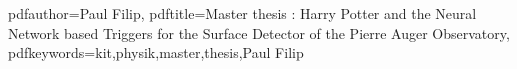 \newcommand{\thesisentopic}{Harry Potter and the Neural Network based Triggers for the Surface Detector of the Pierre Auger Observatory}

\newcommand{\thesisinstitute}{Institute for Astro Particle Physics}

\newcommand{\thesisauthor}{Paul Filip}
\newcommand{\thesisreviewerone}{Prof. Dr. Ralph Engel}
\newcommand{\thesisreviewertwo}{Prof. Dr. Guido Drexlin}

\newcommand{\thesistimestart}{01.04.2022}
\newcommand{\thesistimeend}{31.03.2022}
\newcommand{\thesistimehandin}{TBD}

\hypersetup
{
	pdfauthor={\thesisauthor},
	pdftitle={Master thesis : \thesisentopic},
	pdfkeywords={kit,physik,master,thesis,\thesisauthor}
}
